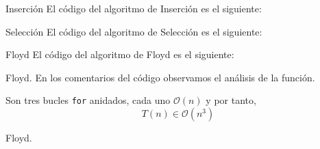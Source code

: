 \documentclass[10pt, xcolor=table]{beamer}
\begin{document}
\begin{frame}{Inserción}
	El código del algoritmo de Inserción es el siguiente:
	
\end{frame}

\begin{frame}{Selección}
	El código del algoritmo de Selección es el siguiente:
	
\end{frame}


\begin{frame}{Floyd}
El código del algoritmo de Floyd es el siguiente:

\end{frame}

\begin{frame}[fragile]{Floyd.
}
En los comentarios del código observamos el análisis de la función.

Son tres bucles \texttt{for} anidados, cada uno \(\mathcal{O}(n)\) y por tanto,
\[
	T(n) \in \mathcal{O}(n^3)
\]
\end{frame}

\begin{frame}{Floyd.
}
\begin{table}[h!]
	\centering
	\footnotesize
		\caption{Experiencia empírica de algoritmo de Floyd sin optimizar}
\end{table}
\end{frame}
\end{document}
